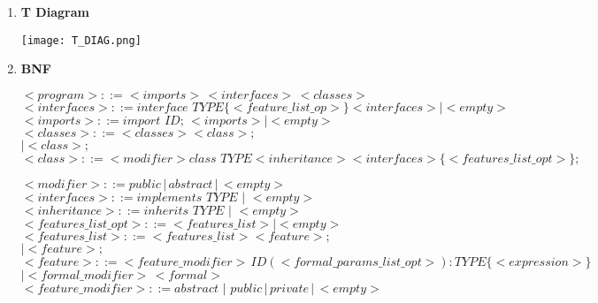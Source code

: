 \documentclass[11pt]{article}
\begin{document}
\begin{enumerate}
    \item \textbf{T Diagram}
    
    
    \texttt{[image: T\_DIAG.png]}
    
    \newpage
    \item \textbf{BNF}
    
\color{blue}
$<program>                 ::= <imports>\,<interfaces>\,<classes>$\\

$<interfaces>                 ::= interface \,\,TYPE \{<feature\_list\_op>\} <interfaces> | <empty>$\\

$<imports>                 ::= import \,\,ID;\,<imports> | <empty>$\\
\color{black}
$<classes>                 ::= <classes> <class> ;$\\
                          \hspace*{2.5cm}$|   <class> ;$\\

$<class>                   ::= <modifier> class \,\,TYPE <inheritance> <interfaces> \{ <features\_list\_opt> \} ;$\\
\color{blue}

$<modifier>                 ::= public \,|\, abstract \,| \,<empty>$\\

$<interfaces>                 ::= implements \,\,TYPE \,\,| \,\,<empty>$\\
\color{black}
$<inheritance>             ::= inherits \,\,TYPE \,\,|\,\, <empty>$\\

$<features\_list\_opt>       ::= <features\_list> | <empty>$\\

$<features\_list>           ::= <features\_list> <feature> ;$\\
                          \hspace*{3.6cm}$|   <feature> ;$\\

$<feature>                 ::= <feature\_modifier> \,ID ( <formal\_params\_list\_opt> ) : TYPE \{ <expression> \}$\\
                          \hspace*{2.9cm}$| <formal\_modifier>\,<formal>$\\
\color{blue}                          
$<feature\_modifier>             ::=  abstract \,\,|\,\, public\, | \,private \,|\, <empty>$\\


\end{enumerate}
\end{document}
